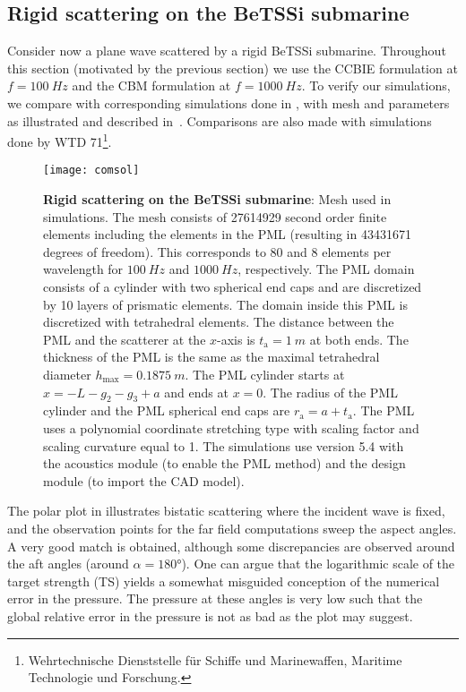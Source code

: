\subsection{Rigid scattering on the BeTSSi submarine}
Consider now a plane wave scattered by a rigid BeTSSi submarine. Throughout this section (motivated by the previous section) we use the CCBIE formulation at $f=\SI{100}{Hz}$ and the CBM formulation at $f=\SI{1000}{Hz}$. To verify our simulations, we compare with corresponding simulations done in \COMSOL, with mesh and parameters as illustrated and described in~. Comparisons are also made with simulations done by WTD 71\footnote{Wehrtechnische Dienststelle f\"{u}r Schiffe und Marinewaffen, Maritime Technologie und Forschung.}.
\begin{figure}
	\centering
	\texttt{[image: comsol]}
	\caption{\textbf{Rigid scattering on the BeTSSi submarine}: Mesh used in \COMSOL simulations. The mesh consists of \num{27614929} second order finite elements including the elements in the PML (resulting in \num{43431671} degrees of freedom). This corresponds to 80 and 8 elements per wavelength for $\SI{100}{Hz}$ and $\SI{1000}{Hz}$, respectively.  The PML domain consists of a cylinder with two spherical end caps and are discretized by 10 layers of prismatic elements. The domain inside this PML is discretized with tetrahedral elements. The distance between the PML and the scatterer at the $x$-axis is $t_{\mathrm{a}}=\SI{1}{m}$ at both ends. The thickness of the PML is the same as the maximal tetrahedral diameter $h_{\mathrm{max}}=\SI{0.1875}{m}$. The PML cylinder starts at $x=-L-g_2-g_3+a$ and ends at $x=0$. The radius of the PML cylinder and the PML spherical end caps are $r_{\mathrm{a}} = a+t_{\mathrm{a}}$. The PML uses a polynomial coordinate stretching type with scaling factor and scaling curvature equal to 1. The simulations use \COMSOL version 5.4 with the acoustics module (to enable the PML method) and the design module (to import the CAD model).}
	\label{Fig3:COMSOL}
\end{figure}
The polar plot in  illustrates bistatic scattering where the incident wave is fixed, and the observation points for the far field computations sweep the aspect angles. A very good match is obtained, although some discrepancies are observed around the aft angles (around $\alpha=\ang{180}$). One can argue that the logarithmic scale of the target strength (TS) yields a somewhat misguided conception of the numerical error in the pressure. The pressure at these angles is very low such that the global relative error in the pressure is not as bad as the plot may suggest.
